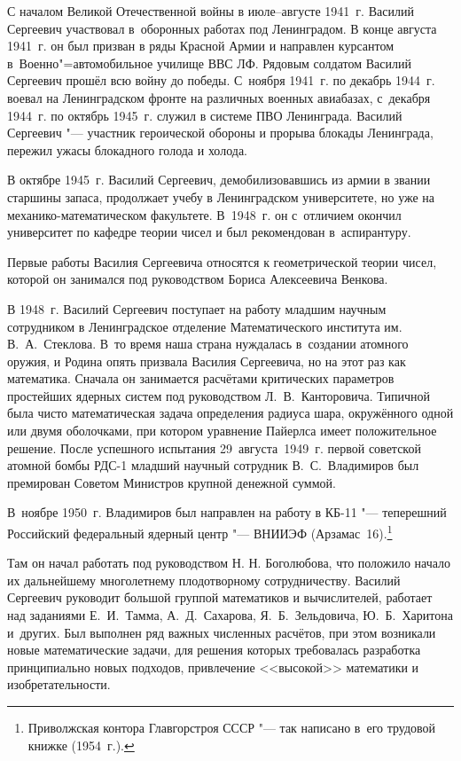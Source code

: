 С началом Великой Отечественной войны в июле--августе 1941~г. Василий Сергеевич участвовал в~оборонных работах под Ленинградом. В конце августа 1941~г. он был призван в ряды Красной Армии и направлен курсантом в~Военно"=автомобильное училище ВВС ЛФ. Рядовым солдатом Василий Сергеевич прошёл всю войну до победы. 
С~ноября 1941~г. по декабрь 1944~г. воевал на Ленинградском фронте на различных военных авиабазах, с~декабря 1944~г. по октябрь 1945~г. служил в системе ПВО Ленинграда.
Василий Сергеевич "--- участник героической обороны и прорыва блокады Ленинграда, пережил ужасы блокадного голода и холода.

В октябре 1945~г. Василий Сергеевич, демобилизовавшись из армии в звании старшины запаса, продолжает учебу в Ленинградском университете, но уже на механико-математическом факультете. 
В~1948~г. он с~отличием окончил университет по кафедре теории чисел и был рекомендован в~аспирантуру.

Первые работы Василия Сергеевича относятся к геометрической теории чисел, которой он занимался под руководством Бориса Алексеевича Венкова.

В 1948~г. Василий Сергеевич поступает на работу младшим научным сотрудником в Ленинградское отделение Математического института им. \linebreak В.~А.~Стеклова. 
В~то время наша страна нуждалась в~создании атомного оружия, и Родина опять призвала Василия Сергеевича, но на этот раз как математика. Сначала он занимается расчётами критических параметров простейших ядерных систем под руководством Л.~В.~Канторовича. 
Типичной была чисто математическая задача определения радиуса шара, окружённого одной или двумя оболочками, при котором уравнение Пайерлса имеет положительное решение. 
После успешного испытания 29~августа~1949~г. первой советской атомной бомбы РДС-1 младший научный сотрудник В.~С.~Владимиров был премирован Советом Министров крупной денежной суммой.

В~ноябре 1950~г. Владимиров был направлен на работу в КБ-11 "--- теперешний Российский федеральный ядерный центр "--- ВНИИЭФ \mbox{(Арзамас~16)}.\footnote{Приволжская контора Главгорстроя СССР "--- так написано в~его трудовой книжке (1954~г.).}

Там он начал работать под руководством Н. Н. Боголюбова, что положило начало их дальнейшему многолетнему плодотворному сотрудничеству. 
Василий Сергеевич руководит большой группой математиков и вычислителей, работает над заданиями Е.~И.~Тамма, А.~Д.~Сахарова, Я.~Б.~Зельдовича, Ю.~Б.~Харитона и~других. 
Был выполнен ряд важных численных расчётов, при этом возникали новые математические задачи, для решения которых требовалась разработка принципиально новых подходов, привлечение <<высокой>> математики и изобретательности. 

